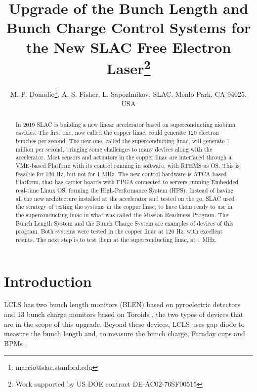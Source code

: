\documentclass[letter,
        biblatex,   %
        keeplastbox,  %
        ]{jacow}
\begin{document}
\title{Upgrade of the Bunch Length and Bunch Charge Control Systems for the New SLAC Free Electron Laser\thanks{Work supported by US DOE contract DE-AC02-76SF00515}}

\author{M. P. Donadio\thanks{marcio@slac.stanford.edu}, A. S. Fisher, L. Sapozhnikov, SLAC, Menlo Park, CA 94025, USA}
	
\maketitle


\begin{abstract}
In 2019 SLAC is building a new linear accelerator based on superconducting niobium cavities. The first one, now called the copper linac, could generate 120 electron bunches per second. The new one, called the superconducting linac, will generate 1 million per second, bringing some challenges to many devices along with the accelerator. Most sensors and actuators in the copper linac are interfaced through a VME-based Platform with its control running in software, with RTEMS as OS. This is feasible for 120 Hz, but not for 1 MHz. The new control hardware is ATCA-based Platform, that has carrier boards with FPGA connected to servers running Embedded real-time Linux OS, forming the High-Performance System (HPS). Instead of having all the new architecture installed at the accelerator and tested on the go, SLAC used the strategy of testing the systems in the copper linac, to have them ready to use in the superconducting linac in what was called the Mission Readiness Program. The Bunch Length System and the Bunch Charge System are examples of devices of this program. Both systems were tested in the copper linac at 120 Hz, with excellent results. The next step is to test them at the superconducting linac, at 1 MHz.
\end{abstract}


\section{Introduction}
LCLS has two bunch length monitors (BLEN) based on pyroelectric detectors \cite{blen-pac07} and 13 bunch charge monitors based on Toroids \cite{slac-toroids}, the two types of devices that are in the scope of this upgrade. Beyond these devices, LCLS uses gap diode to measure the bunch length \cite{injector-commissioning-2007} and, to measure the bunch charge, Faraday cups \cite{slac-toroids} and BPMs \cite{beam-measurement}.
\end{document}
